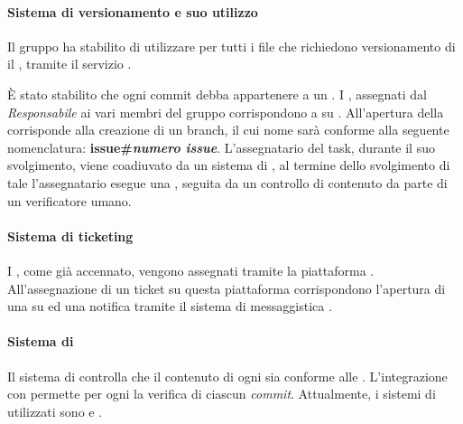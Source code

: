 \paragraph*{Sistema di versionamento e suo utilizzo} Il gruppo ha stabilito di utilizzare per tutti i file che richiedono versionamento di il  , tramite il servizio .

È stato stabilito che ogni commit debba appartenere a un . I , assegnati dal \textit{Responsabile} ai vari membri del gruppo corrispondono a  su . All'apertura della  corrisponde alla creazione di un branch, il cui nome sarà conforme alla seguente nomenclatura: \textbf{issue\#\textit{numero issue}}. L'assegnatario del task, durante il suo svolgimento, viene coadiuvato da un sistema di , al termine dello svolgimento di tale  l'assegnatario esegue una , seguita da un controllo di contenuto da parte di un verificatore umano.

\paragraph*{Sistema di ticketing} I , come già accennato, vengono assegnati tramite la piattaforma . All'assegnazione di un ticket su questa piattaforma corrispondono l'apertura di una  su  ed una notifica tramite il sistema di messaggistica .

\paragraph*{Sistema di }Il sistema di  controlla che il contenuto di ogni  sia conforme alle \NormeDiProgetto. L'integrazione con  permette per ogni  la verifica di ciascun \textit{commit}. Attualmente, i sistemi di  utilizzati sono  e .


